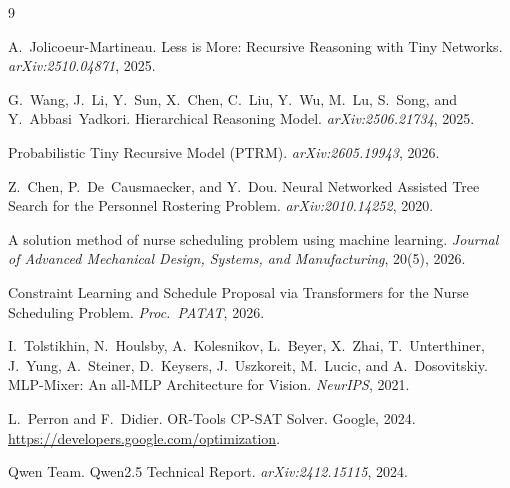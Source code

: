 \documentclass{article}
\begin{document}
\begin{thebibliography}{9}

A.~Jolicoeur-Martineau.
\newblock Less is More: Recursive Reasoning with Tiny Networks.
\newblock \emph{arXiv:2510.04871}, 2025.

G.~Wang, J.~Li, Y.~Sun, X.~Chen, C.~Liu, Y.~Wu, M.~Lu, S.~Song, and
Y.~Abbasi~Yadkori.
\newblock Hierarchical Reasoning Model.
\newblock \emph{arXiv:2506.21734}, 2025.

Probabilistic Tiny Recursive Model (PTRM).
\newblock \emph{arXiv:2605.19943}, 2026.

Z.~Chen, P.~De~Causmaecker, and Y.~Dou.
\newblock Neural Networked Assisted Tree Search for the Personnel Rostering
Problem.
\newblock \emph{arXiv:2010.14252}, 2020.

A solution method of nurse scheduling problem using machine learning.
\newblock \emph{Journal of Advanced Mechanical Design, Systems, and
Manufacturing}, 20(5), 2026.

Constraint Learning and Schedule Proposal via Transformers for the Nurse
Scheduling Problem.
\newblock \emph{Proc.\ PATAT}, 2026.

I.~Tolstikhin, N.~Houlsby, A.~Kolesnikov, L.~Beyer, X.~Zhai, T.~Unterthiner,
J.~Yung, A.~Steiner, D.~Keysers, J.~Uszkoreit, M.~Lucic, and A.~Dosovitskiy.
\newblock MLP-Mixer: An all-MLP Architecture for Vision.
\newblock \emph{NeurIPS}, 2021.

L.~Perron and F.~Didier.
\newblock OR-Tools CP-SAT Solver.
\newblock Google, 2024. \url{https://developers.google.com/optimization}.

Qwen Team.
\newblock Qwen2.5 Technical Report.
\newblock \emph{arXiv:2412.15115}, 2024.

\end{thebibliography}
\end{document}
